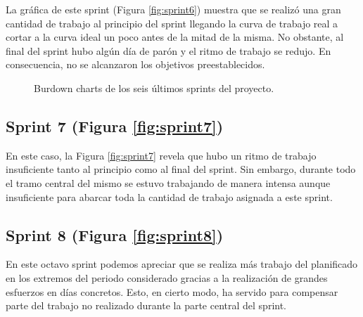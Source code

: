 La gráfica de este sprint (Figura \ref{fig:sprint6}) muestra que se realizó una gran cantidad de trabajo al principio del sprint llegando la curva de trabajo real a cortar a la curva ideal un poco antes de la mitad de la misma. No obstante, al final del sprint hubo algún día de parón y el ritmo de trabajo se redujo. En consecuencia, no se alcanzaron los objetivos preestablecidos.

\begin{figure}[H]
\centering
{}\qquad
{}\qquad
{}\qquad
{}\qquad
{}\qquad
{}
\caption{Burdown charts de los seis últimos sprints del proyecto.}
\label{fig:sprints7-12}
\end{figure}

\subsection{Sprint 7 (Figura \ref{fig:sprint7})}

En este caso, la Figura \ref{fig:sprint7} revela que hubo un ritmo de trabajo insuficiente tanto al principio como al final del sprint. Sin embargo, durante todo el tramo central del mismo se estuvo trabajando de manera intensa aunque insuficiente para abarcar toda la cantidad de trabajo asignada a este sprint.

\subsection{Sprint 8 (Figura \ref{fig:sprint8})}

En este octavo sprint podemos apreciar que se realiza más trabajo del planificado en los extremos del periodo considerado gracias a la realización de grandes esfuerzos en días concretos. Esto, en cierto modo, ha servido para compensar parte del trabajo no realizado durante la parte central del sprint.

